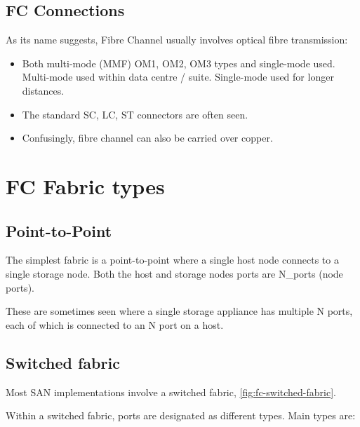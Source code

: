 \subsection{FC Connections}
\label{sec:fc-connections}

As its name suggests, Fibre Channel usually involves optical fibre
transmission:

\begin{itemize}
\item
  Both multi-mode (MMF) OM1, OM2, OM3 types and single-mode used.
  Multi-mode used within data centre / suite. Single-mode used for
  longer distances.
\item
  The standard SC, LC, ST connectors are often seen.
\item
  Confusingly, fibre channel can also be carried over copper.
\end{itemize}

\section{FC Fabric types}
\label{sec:fc-fabric-types}

\subsection{Point-to-Point}
\label{sec:point-to-point}

The simplest fabric is a point-to-point where a single host node
connects to a single storage node. Both the host and storage nodes ports
are N\_ports (node ports).


These are sometimes seen where a single storage appliance has multiple N
ports, each of which is connected to an N port on a host.

\subsection{Switched fabric}
\label{sec:switched-fabric}

Most SAN implementations involve a switched fabric, \autoref{fig:fc-switched-fabric}.


Within a switched fabric, ports are designated as different types. Main
types are:

